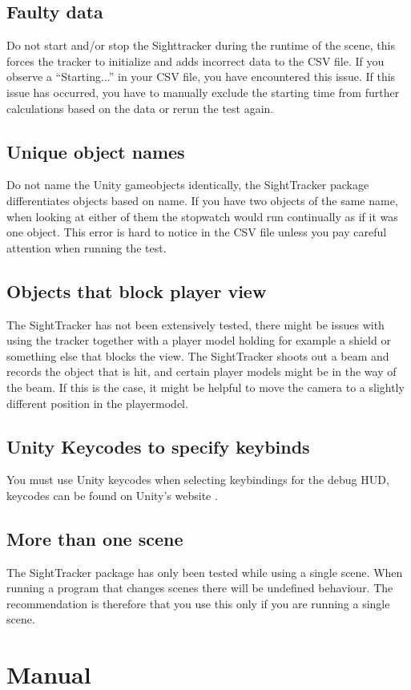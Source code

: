 \documentclass[letterpaper]{article}
\begin{document}
\subsection{Faulty data}
Do not start and/or stop the Sighttracker during the runtime of the scene, this forces the tracker to initialize and adds incorrect data to the CSV file. If you observe a “Starting...” in your CSV file, you have encountered this issue. If this issue has occurred, you have to manually exclude the starting time from further calculations based on the data or rerun the test again.
\subsection{Unique object names}
Do not name the Unity gameobjects identically, the SightTracker package differentiates objects based on name. If you have two objects of the same name, when looking at either of them the stopwatch would run continually as if it was one object. This error is hard to notice in the CSV file unless you pay careful attention when running the test.
\subsection{Objects that block player view}
The SightTracker has not been extensively tested, there might be issues with using the tracker together with a player model holding for example a shield or something else that blocks the view. The SightTracker shoots out a beam and records the object that is hit, and certain player models might be in the way of the beam. If this is the case, it might be helpful to move the camera to a slightly different position in the playermodel.
\subsection{Unity Keycodes to specify keybinds}
You must use Unity keycodes when selecting keybindings for the debug HUD, keycodes can be found on Unity's website \cite{unitykeycode}.
\subsection{More than one scene}
The SightTracker package has only been tested while using a single scene. When running a program that changes scenes there will be undefined behaviour. The recommendation is therefore that you use this only if you are running a single scene.
\newpage
\section{Manual}
\end{document}
